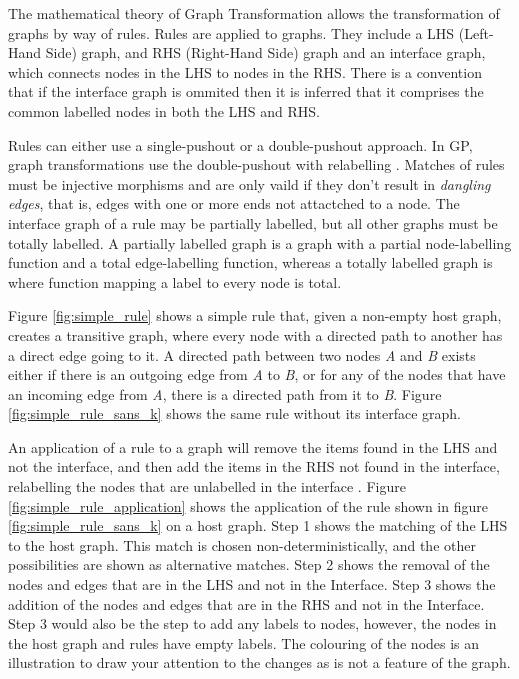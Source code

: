 \documentclass{UoYCSproject}
\begin{document}
The mathematical theory of Graph Transformation allows the transformation of graphs by way of rules. Rules are applied to graphs. They include a LHS (Left-Hand Side) graph, and RHS (Right-Hand Side) graph and an interface graph, which connects nodes in the LHS to nodes in the RHS. There is a convention that if the interface graph is ommited then it is inferred that it comprises the common labelled nodes in both the LHS and RHS.

Rules can either use a single-pushout or a double-pushout approach. In GP, graph transformations use the double-pushout with relabelling \cite[p. 100]{gp1}. Matches of rules must be injective morphisms and are only vaild if they don't result in \emph{dangling edges}, that is, edges with one or more ends not attactched to a node. The interface graph of a rule may be partially labelled, but all other graphs must be totally labelled. A partially labelled graph is a graph with a partial node-labelling function and a total edge-labelling function, whereas a totally labelled graph is where function mapping a label to every node is total.

Figure \ref{fig:simple_rule} shows a simple rule that, given a non-empty host graph, creates a transitive graph, where every node with a directed path to another has a direct edge going to it. A directed path between two nodes \emph{A} and \emph{B} exists either if there is an outgoing edge from \emph{A} to \emph{B}, or for any of the nodes that have an incoming edge from \emph{A}, there is a directed path from it to \emph{B}.
Figure \ref{fig:simple_rule_sans_k} shows the same rule without its interface graph.



An application of a rule to a graph will remove the items found in the LHS and not the interface, and then add the items in the RHS not found in the interface, relabelling the nodes that are unlabelled in the interface \cite{gp_lang, gp2_design}. Figure \ref{fig:simple_rule_application} shows the application of the rule shown in figure \ref{fig:simple_rule_sans_k} on a host graph. Step 1 shows the matching of the LHS to the host graph. This match is chosen non-deterministically, and the other possibilities are shown as alternative matches. Step 2 shows the removal of the nodes and edges that are in the LHS and not in the Interface. Step 3 shows the addition of the nodes and edges that are in the RHS and not in the Interface. Step 3 would also be the step to add any labels to nodes, however, the nodes in the host graph and rules have empty labels. The colouring of the nodes is an illustration to draw your attention to the changes as is not a feature of the graph.
\end{document}
